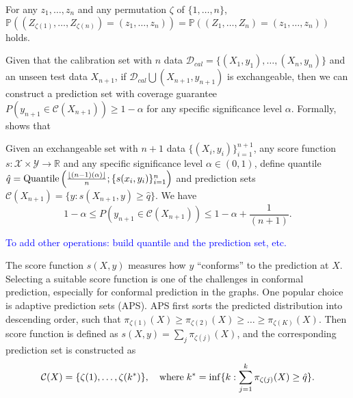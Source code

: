 \begin{definition}[Exchangeability]
\label{def:exchangeability}
    For any $z_1, \dots, z_n$ and any permutation $\zeta$ of $\{1, \dots, n\}$, 
    $\mathbb{P} \left( (Z_{\zeta(1)}, \dots, Z_{\zeta(n)}) = (z_1, \dots, z_n) \right) = 
    \mathbb{P} \left( (Z_1, \dots, Z_n) = (z_1, \dots, z_n) \right)$ holds. 
\end{definition}

Given that the calibration set with $n$ data $\mathcal{D}_{cal}=\{ (X_1, y_1), \dots, (X_n, y_n) \}$ and an unseen test data $X_{n+1}$, if $\mathcal{D}_{cal} \bigcup {(X_{n+1}, y_{n+1})}$ is exchangeable, then we can construct a prediction set with coverage guarantee $P(y_{n+1}\in \mathcal{C}(X_{n+1})) \geq 1 - \alpha$ for any specific significance level $\alpha$.
Formally, \cite{vovk2005algorithmic} shows that
\begin{theorem}
    Given an exchangeable set with $n+1$ data $\{ (X_i, y_i)\}_{i=1}^{n+1}$, 
    any score function $s: \mathcal{X}\times \mathcal{Y}\to \mathbb{R}$ and any specific significance level $\alpha \in (0, 1)$,
    define quantile $\hat{q}=\textnormal{Quantile}\left( \frac{ \lfloor (n-1)(\alpha) \rfloor }{n}; \{ s(x_i, y_i) \}_{i=1}^n \right)$ and prediction sets 
    $\mathcal{C}(X_{n+1}) = \{ y: s(X_{n+1},y) \geq \hat{q} \}$.
    We have
    \begin{equation}
        1-\alpha \leq P \left( y_{n+1} \in \mathcal{C}(X_{n+1}) \right) \leq 1- \alpha + \frac{1}{(n+1)}.
    \end{equation}
\end{theorem}
\textcolor{blue}{To add other operations: build quantile and the prediction set, etc.}

The score function $s(X, y)$ measures how $y$ ``conforms'' to the prediction at $X$.
Selecting a suitable score function is one of the challenges in conformal prediction, especially for conformal prediction in the graphs. 
% 
One popular choice is adaptive prediction sets (APS).
APS first sorts the predicted distribution into descending order, such that 
$\pi_{\zeta(1)}(X) \geq \pi_{\zeta(2)}(X) \geq \dots \geq \pi_{\zeta(K)}(X)$.
Then score function is defined as $s(X,y) = \sum_{j} \pi_{\zeta(j)}(X)$,
and the corresponding prediction set is constructed as
\begin{equation}
    \mathcal{C}(X)=\{ \zeta(1), \dots, \zeta(k^\ast) \}, \quad
    \textnormal{where} \; k^\ast=\inf\{ k: \sum_{j=1}^k \pi_{\zeta(j)}(X) \geq \hat{q} \}.
\end{equation}

